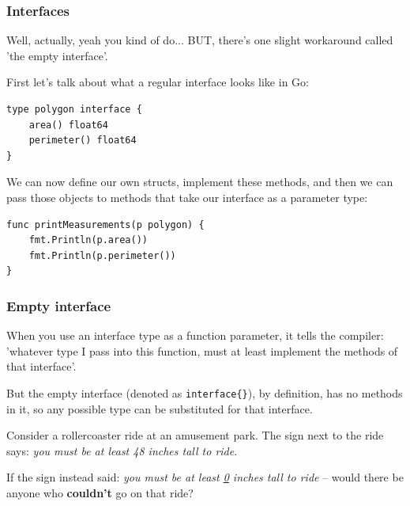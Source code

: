 \documentclass{beamer}
\begin{document}
\begin{frame}[fragile]
\frametitle{Interfaces}

Well, actually, yeah you kind of do... BUT, there's one slight workaround called 'the empty interface'. 

First let's talk about what a regular interface looks like in Go:

\begin{lstlisting}
type polygon interface {
	area() float64
	perimeter() float64
}
\end{lstlisting}

We can now define our own structs, implement these methods, and then we can pass those objects to methods that take our interface as a parameter type:

\begin{lstlisting}
func printMeasurements(p polygon) {
    fmt.Println(p.area())
    fmt.Println(p.perimeter())
}
\end{lstlisting}

\end{frame}

\begin{frame}
\frametitle{Empty interface}

When you use an interface type as a function parameter, it tells the compiler: 'whatever type I pass into this function, must at least implement the methods of that interface'.

\vspace{0.5cm}

But the empty interface (denoted as \texttt{interface\{\}}), by definition, has no methods in it, so any possible type can be substituted for that interface. 

\vspace{0.5cm}

Consider a rollercoaster ride at an amusement park. The sign next to the ride says: \textit{you must be at least 48 inches tall to ride}. 

\vspace{0.5cm} 

If the sign instead said: \textit{you must be at least \underline{0} inches tall to ride} -- would there be anyone who \textbf{couldn't} go on that ride?

\end{frame}
\end{document}
